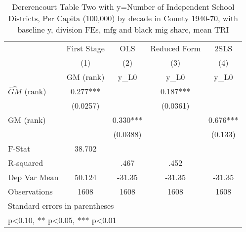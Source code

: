 \begin{table}[htbp]\centering
\def\sym#1{\ifmmode^{#1}\else\(^{#1}\)\fi}
\caption{Dererencourt Table Two with y=Number of Independent School Districts, Per Capita (100,000) by decade in County 1940-70, with baseline y, division FEs, mfg and black mig share, mean TRI}
\begin{tabular}{l*{4}{c}}
\toprule
                    & First Stage   &         OLS   &Reduced Form   &        2SLS   \\
                    &\multicolumn{1}{c}{(1)}&\multicolumn{1}{c}{(2)}&\multicolumn{1}{c}{(3)}&\multicolumn{1}{c}{(4)}\\
                    &\multicolumn{1}{c}{GM  (rank)}&\multicolumn{1}{c}{y\_L0}&\multicolumn{1}{c}{y\_L0}&\multicolumn{1}{c}{y\_L0}\\
\midrule
$\hat{GM}$ (rank)   &       0.277***&               &       0.187***&               \\
                    &    (0.0257)   &               &    (0.0361)   &               \\
\addlinespace
GM  (rank)          &               &       0.330***&               &       0.676***\\
                    &               &    (0.0388)   &               &     (0.133)   \\
\midrule
F-Stat              &      38.702   &               &               &               \\
R-squared           &               &        .467   &        .452   &               \\
Dep Var Mean        &      50.124   &      -31.35   &      -31.35   &      -31.35   \\
Observations        &        1608   &        1608   &        1608   &        1608   \\
\bottomrule
\multicolumn{5}{l}{\footnotesize Standard errors in parentheses}\\
\multicolumn{5}{l}{\footnotesize * p<0.10, ** p<0.05, *** p<0.01}\\
\end{tabular}
\end{table}

